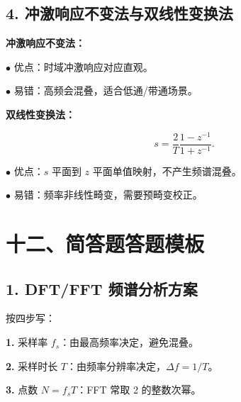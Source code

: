 \documentclass[11pt]{ctexart}
\begin{document}
\subsection*{4. 冲激响应不变法与双线性变换法}



\textbf{冲激响应不变法：}\par



\noindent\(\bullet\) 优点：时域冲激响应对应直观。\par

\noindent\(\bullet\) 易错：高频会混叠，适合低通/带通场景。\par



\textbf{双线性变换法：}\par



\[

s=\frac{2}{T}\frac{1-z^{-1}}{1+z^{-1}}.

\]



\noindent\(\bullet\) 优点：\(s\) 平面到 \(z\) 平面单值映射，不产生频谱混叠。\par

\noindent\(\bullet\) 易错：频率非线性畸变，需要预畸变校正。\par



\section*{十二、简答题答题模板}



\subsection*{1. DFT/FFT 频谱分析方案}



按四步写：\par



\noindent\textbf{1.} 采样率 \(f_s\)：由最高频率决定，避免混叠。\par

\noindent\textbf{2.} 采样时长 \(T\)：由频率分辨率决定，\(\Delta f=1/T\)。\par

\noindent\textbf{3.} 点数 \(N=f_sT\)：FFT 常取 2 的整数次幂。\par
\end{document}
